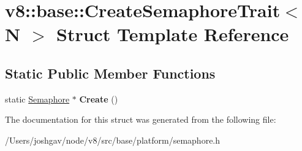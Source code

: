 \hypertarget{structv8_1_1base_1_1_create_semaphore_trait}{}\section{v8\+:\+:base\+:\+:Create\+Semaphore\+Trait$<$ N $>$ Struct Template Reference}
\label{structv8_1_1base_1_1_create_semaphore_trait}
\subsection*{Static Public Member Functions}
\begin{DoxyCompactItemize}
\item 
static \hyperlink{classv8_1_1base_1_1_semaphore}{Semaphore} $\ast$ {\bfseries Create} ()\hypertarget{structv8_1_1base_1_1_create_semaphore_trait_a4d3cf2d1ca658f22d5f76a883ab46091}{}\label{structv8_1_1base_1_1_create_semaphore_trait_a4d3cf2d1ca658f22d5f76a883ab46091}

\end{DoxyCompactItemize}


The documentation for this struct was generated from the following file\+:\begin{DoxyCompactItemize}
\item 
/\+Users/joshgav/node/v8/src/base/platform/semaphore.\+h\end{DoxyCompactItemize}

